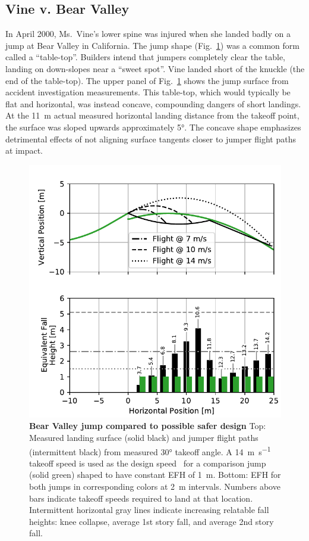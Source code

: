 \documentclass[smallextended]{svjour3}       %
\begin{document}
\subsection{Vine v. Bear Valley}
\label{sec:vine}
%
In April 2000, Ms.~Vine's lower spine was injured when she landed badly on a
jump at Bear Valley in California. The jump shape
(Fig.~\ref{fig:vine-v-bear-valley}) was a common form called a ``table-top''.
Builders intend that jumpers completely clear the table, landing on down-slopes
near a ``sweet spot''.  Vine landed short of the knuckle (the end of the
table-top). The upper panel of Fig.~\ref{fig:vine-v-bear-valley} shows the jump
surface from accident investigation measurements. This table-top, which would
typically be flat and horizontal, was instead concave, compounding dangers of
short landings. At the 11~\si{\meter} actual measured horizontal landing
distance from the takeoff point, the surface was sloped upwards approximately
5\si{\degree}. The concave shape emphasizes detrimental effects of not aligning
surface tangents closer to jumper flight paths at impact.
%
\begin{figure}
  \centering
  \includegraphics[width=\columnwidth]{figures/vine-v-bear-valley.pdf}
  \caption{\textbf{Bear Valley jump compared to possible safer design}
  Top: Measured landing surface (solid black) and jumper flight paths
  (intermittent black) from measured 30\si{\degree} takeoff angle.  A
  14~\si{\meter\per\second} takeoff speed is used as the design
  speed~\cite{Levy2015} for a comparison jump (solid green) shaped to have
  constant EFH of 1~\si{\meter}.
  Bottom: EFH for both jumps in corresponding colors at 2~\si{\meter}
  intervals. Numbers above bars indicate takeoff speeds required to land at
  that location.
  Intermittent horizontal gray lines indicate increasing relatable fall
  heights: knee collapse, average 1st story fall, and average 2nd story fall.
  }
  \label{fig:vine-v-bear-valley}
\end{figure}
\end{document}
